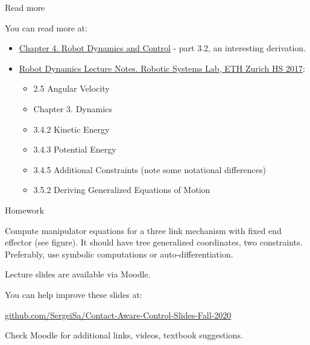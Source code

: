 \documentclass{beamer}
\begin{document}
\begin{frame}{Read more}
\begin{flushleft}

You can read more at:

\begin{itemize}
    \item \href{https://www.cds.caltech.edu/~murray/books/MLS/pdf/mls94-manipdyn_v1_2.pdf}{Chapter 4. Robot Dynamics and
Control} - part 3.2, an interesting derivation.
    \item \href{https://ethz.ch/content/dam/ethz/special-interest/mavt/robotics-n-intelligent-systems/rsl-dam/documents/RobotDynamics2017/RD_HS2017script.pdf}{Robot Dynamics Lecture Notes. Robotic Systems Lab, ETH Zurich HS 2017}:
    \begin{itemize}
        \item 2.5 Angular Velocity
        \item Chapter 3. Dynamics
        \item 3.4.2 Kinetic Energy
        \item 3.4.3 Potential Energy
        \item 3.4.5 Additional Constraints (note some notational differences)
        \item 3.5.2 Deriving Generalized Equations of Motion
    \end{itemize}
    
    




\end{itemize}

\end{flushleft}
\end{frame}


\begin{frame}{Homework}
\begin{flushleft}

Compute manipulator equations for a three link mechanism with fixed end effector (see figure). It should have tree generalized coordinates, two constraints. Preferably, use symbolic computations or auto-differentiation.

\begin{figure}
    \centering
    
\end{figure}

\end{flushleft}
\end{frame}



\begin{frame}
\centerline{Lecture slides are available via Moodle.}
\bigskip
\centerline{You can help improve these slides at:}
\centerline{\href{https://github.com/SergeiSa/Contact-Aware-Control-Slides-Fall-2020}{github.com/SergeiSa/Contact-Aware-Control-Slides-Fall-2020}}
\bigskip
\centerline{Check Moodle for additional links, videos, textbook suggestions.}
\end{frame}
\end{document}
